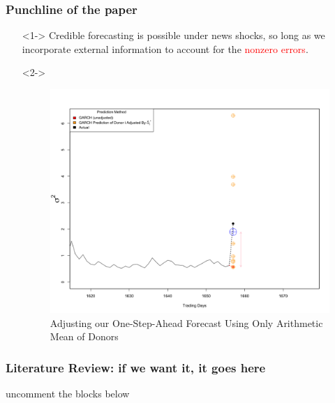 \documentclass[9pt]{beamer}
\theoremstyle{definition}
\begin{document}
\begin{frame}
\frametitle{Punchline of the paper}

\begin{itemize}
    \item[] <1-> Credible forecasting is possible under news shocks, so long as we incorporate external information to account for the \textcolor{red}{nonzero errors}.
    \item[] <2-> \begin{figure}[H]
        \begin{center}
          \includegraphics[scale=.1]{simulation_plots/motivating_piece_convex_combination.png}
          \caption{Adjusting our One-Step-Ahead Forecast Using Only Arithmetic Mean of Donors}
          \end{center}
        \end{figure}
\end{itemize}
\end{frame}

\begin{frame}
    \frametitle{Literature Review: if we want it, it goes here}
uncomment the blocks below
\end{frame}


\end{document}
